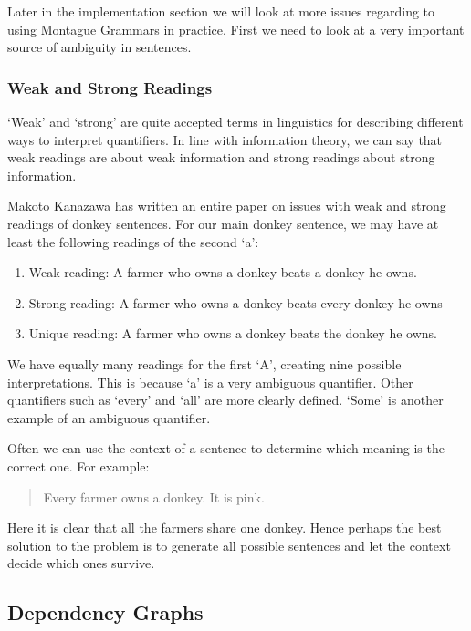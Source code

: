 \documentclass[12pt]{article}
\begin{document}
Later in the implementation section we will look at more issues regarding to using Montague Grammars in practice. First we need to look at a very important source of ambiguity in sentences.

\subsubsection{Weak and Strong Readings}

`Weak' and `strong' are quite accepted terms in linguistics for describing different ways to interpret quantifiers. In line with information theory, we can say that weak readings are about weak information and strong readings about strong information.

Makoto Kanazawa has written an entire paper on issues with weak and strong readings of donkey sentences\cite{kanazawa1994weak}. For our main donkey sentence, we may have at least the following readings of the second `a':
\begin{enumerate}
\item Weak reading: A farmer who owns a donkey beats a donkey he owns. 
\item Strong reading: A farmer who owns a donkey beats every donkey he owns 
\item Unique reading: A farmer who owns a donkey beats the donkey he owns. 
\end{enumerate}

We have equally many readings for the first `A', creating nine possible interpretations. This is because `a' is a very ambiguous quantifier. Other quantifiers such as `every' and `all' are more clearly defined. `Some' is another example of an ambiguous quantifier.

Often we can use the context of a sentence to determine which meaning is the correct one. For example:
\begin{quotation}
Every farmer owns a donkey. It is pink.
\end{quotation}
Here it is clear that all the farmers share one donkey. Hence perhaps the best solution to the problem is to generate all possible sentences and let the context decide which ones survive.

\subsection{Dependency Graphs}
\end{document}
